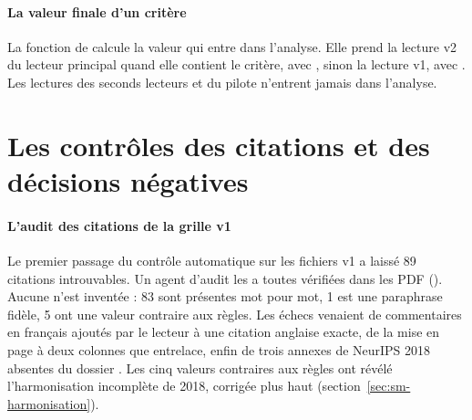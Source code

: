 \paragraph{La valeur finale d'un critère}
La fonction  de  calcule la valeur qui entre dans
l'analyse. Elle prend la lecture v2 du lecteur principal quand elle contient le critère, avec
, sinon la lecture v1, avec . Les lectures des seconds
lecteurs et du pilote n'entrent jamais dans l'analyse.

\section{Les contrôles des citations et des décisions négatives}\label{sec:sm-controles}

\paragraph{L'audit des citations de la grille v1}
Le premier passage du contrôle automatique sur les fichiers v1 a laissé 89 citations introuvables.
Un agent d'audit les a toutes vérifiées dans les PDF (). Aucune n'est
inventée : 83 sont présentes mot pour mot, 1 est une paraphrase fidèle, 5 ont une valeur contraire aux
règles. Les échecs venaient de commentaires en français ajoutés par le lecteur à une citation anglaise
exacte, de la mise en page à deux colonnes que  entrelace, enfin de trois annexes de
NeurIPS 2018 absentes du dossier . Les cinq valeurs contraires aux règles ont révélé
l'harmonisation incomplète de 2018, corrigée plus haut (section~\ref{sec:sm-harmonisation}).

